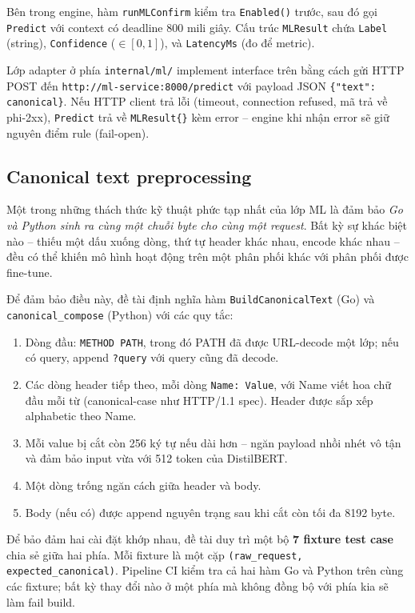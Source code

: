 \documentclass[../DoAn.tex]{subfiles}
\begin{document}
Bên trong engine, hàm \texttt{runMLConfirm} kiểm tra \texttt{Enabled()}
trước, sau đó gọi \texttt{Predict} với context có deadline 800 mili giây.
Cấu trúc \texttt{MLResult} chứa \texttt{Label} (string), \texttt{Confidence}
(\(\in [0, 1]\)), và \texttt{LatencyMs} (đo để metric).

Lớp adapter ở phía \texttt{internal/ml/} implement interface trên bằng
cách gửi HTTP POST đến \texttt{http://ml-service:8000/predict} với payload
JSON \texttt{\{"text": canonical\}}. Nếu HTTP client trả lỗi (timeout,
connection refused, mã trả về phi-2xx), \texttt{Predict} trả về
\texttt{MLResult\{\}} kèm error -- engine khi nhận error sẽ giữ nguyên
điểm rule (fail-open).

\subsection{Canonical text preprocessing}
\label{subsection:4.3.3}

Một trong những thách thức kỹ thuật phức tạp nhất của lớp ML là đảm bảo
\textit{Go và Python sinh ra cùng một chuỗi byte cho cùng một request}.
Bất kỳ sự khác biệt nào -- thiếu một dấu xuống dòng, thứ tự header khác
nhau, encode khác nhau -- đều có thể khiến mô hình hoạt động trên một phân
phối khác với phân phối được fine-tune.

Để đảm bảo điều này, đề tài định nghĩa hàm \texttt{BuildCanonicalText}
(Go) và \texttt{canonical\_compose} (Python) với các quy tắc:

\begin{enumerate}[leftmargin=*]
    \item Dòng đầu: \texttt{METHOD PATH}, trong đó PATH đã được URL-decode
    một lớp; nếu có query, append \texttt{?query} với query cũng đã decode.
    \item Các dòng header tiếp theo, mỗi dòng \texttt{Name: Value}, với
    Name viết hoa chữ đầu mỗi từ (canonical-case như HTTP/1.1 spec). Header
    được sắp xếp alphabetic theo Name.
    \item Mỗi value bị cắt còn 256 ký tự nếu dài hơn -- ngăn payload nhồi
    nhét vô tận và đảm bảo input vừa với 512 token của DistilBERT.
    \item Một dòng trống ngăn cách giữa header và body.
    \item Body (nếu có) được append nguyên trạng sau khi cắt còn tối đa
    8192 byte.
\end{enumerate}

Để bảo đảm hai cài đặt khớp nhau, đề tài duy trì một bộ \textbf{7 fixture
test case} chia sẻ giữa hai phía. Mỗi fixture là một cặp \texttt{(raw\_request,
expected\_canonical)}. Pipeline CI kiểm tra cả hai hàm Go và Python trên
cùng các fixture; bất kỳ thay đổi nào ở một phía mà không đồng bộ với phía
kia sẽ làm fail build.
\end{document}
